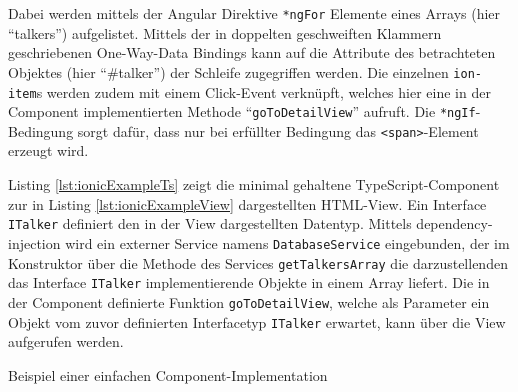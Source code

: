 Dabei werden mittels der Angular Direktive \texttt{*ngFor} Elemente eines Arrays (hier \enquote{talkers}) aufgelistet. Mittels der in doppelten geschweiften Klammern geschriebenen One-Way-Data Bindings kann auf die Attribute des betrachteten Objektes (hier \enquote{\#talker}) der Schleife zugegriffen werden. Die einzelnen \texttt{ion-item}s werden zudem mit einem Click-Event verknüpft, welches hier eine in der Component implementierten Methode \enquote{\texttt{goToDetailView}} aufruft. Die \texttt{*ngIf}-Bedingung sorgt dafür, dass nur bei erfüllter Bedingung das \texttt{<span>}-Element erzeugt wird.

Listing \ref{lst:ionicExampleTs} zeigt die minimal gehaltene TypeScript-Component zur in Listing \ref{lst:ionicExampleView} dargestellten HTML-View. Ein Interface \texttt{ITalker} definiert den in der View dargestellten Datentyp. Mittels dependency-injection wird ein externer Service namens \texttt{DatabaseService} eingebunden, der im Konstruktor über die Methode des Services \texttt{getTalkersArray} die darzustellenden das Interface \texttt{ITalker} implementierende Objekte in einem Array liefert. Die in der Component definierte Funktion \texttt{goToDetailView}, welche als Parameter ein Objekt vom zuvor definierten Interfacetyp \texttt{ITalker} erwartet, kann über die View aufgerufen werden.

\begin{listing}[htb]
    
    \caption{Beispiel einer einfachen Component-Implementation}
    \label{lst:ionicExampleTs}
\end{listing}

